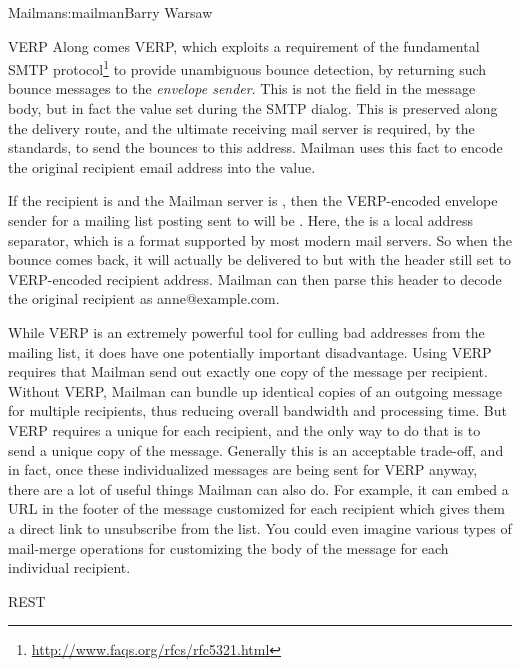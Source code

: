 \begin{aosachapter}{Mailman}{s:mailman}{Barry Warsaw}
\begin{aosasect1}{VERP}
Along comes VERP, which exploits a requirement of the fundamental SMTP
protocol\footnote{\url{http://www.faqs.org/rfcs/rfc5321.html}} to
provide unambiguous bounce detection, by returning such bounce
messages to the \emph{envelope sender}.  This is not the 
field in the message body, but in fact the  value set
during the SMTP dialog.  This is preserved along the delivery route,
and the ultimate receiving mail server is required, by the standards, to
send the bounces to this address.  Mailman uses this fact to encode
the original recipient email address into the  value.

If the recipient is  and the Mailman server is
, then the VERP-encoded envelope sender for a
mailing list posting sent to  will be
.  Here, the \code{+}
is a local address separator, which is a format supported by most
modern mail servers.  So when the bounce comes back, it will actually
be delivered to  but with the
 header still set to VERP-encoded recipient address.
Mailman can then parse this  header to decode the original
recipient as anne@example.com.

While VERP is an extremely powerful tool for culling bad addresses
from the mailing list, it does have one potentially important
disadvantage.  Using VERP requires that Mailman send out exactly one
copy of the message per recipient.  Without VERP, Mailman can bundle
up identical copies of an outgoing message for multiple recipients,
thus reducing overall bandwidth and processing time.  But VERP
requires a unique  for each recipient, and the only
way to do that is to send a unique copy of the message.  Generally
this is an acceptable trade-off, and in fact, once these
individualized messages are being sent for VERP anyway, there are a
lot of useful things Mailman can also do.  For example, it can embed a
URL in the footer of the message customized for each recipient which
gives them a direct link to unsubscribe from the list.  You could even
imagine various types of mail-merge operations for customizing
the body of the message for each individual recipient.

\end{aosasect1}

\begin{aosasect1}{REST}


\end{aosasect1}
\end{aosachapter}
